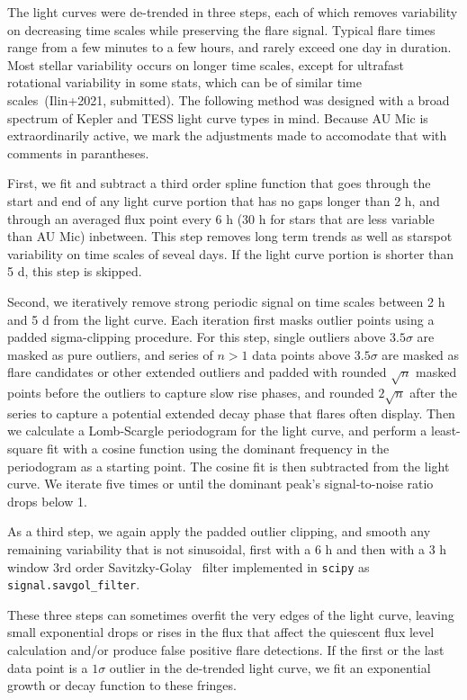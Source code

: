 \documentclass[fleqn,usenatbib,letters]{mnras}%
\begin{document}

The light curves were de-trended in three steps, each of which removes variability on decreasing time scales while preserving the flare signal. Typical flare times range from a few minutes to a few hours, and rarely exceed one day in duration. Most stellar variability occurs on longer time scales, except for ultrafast rotational variability in some stats, which can be of similar time scales~(Ilin+2021, submitted). The following method was designed with a broad spectrum of Kepler and TESS light curve types in mind. Because AU Mic is extraordinarily active, we mark the adjustments made to accomodate that with comments in parantheses. 

First, we fit and subtract a third order spline function that goes through the start and end of any light curve portion that has no gaps longer than 2 h, and through an averaged flux point every 6 h (30 h for stars that are less variable than AU Mic) inbetween. This step removes long term trends as well as starspot variability on time scales of seveal days. If the light curve portion is shorter than 5 d, this step is skipped. 

Second, we iteratively remove strong periodic signal on time scales between 2 h and 5 d from the light curve. Each iteration first masks outlier points using a padded sigma-clipping procedure. For this step, single outliers above $3.5 \sigma$ are masked as pure outliers, and series of $n>1$ data points above $3.5 \sigma$ are masked as flare candidates or other extended outliers and padded with rounded $\sqrt{n}$ masked points before the outliers to capture slow rise phases, and rounded $2\sqrt{n}$ after the series to capture a potential extended decay phase that flares often display. Then we calculate a Lomb-Scargle periodogram for the light curve, and perform a least-square fit with a cosine function using the dominant frequency in the periodogram as a starting point. The cosine fit is then subtracted from the light curve. We iterate five times or until the dominant peak's signal-to-noise ratio drops below 1. 

As a third step, we again apply the padded outlier clipping, and smooth any remaining variability that is not sinusoidal, first with a 6 h and then with a 3 h window 3rd order Savitzky-Golay~\citep{savitzky1964} filter implemented in \texttt{scipy} as \texttt{signal.savgol\_filter}.

These three steps can sometimes overfit the very edges of the light curve, leaving small exponential drops or rises in the flux that affect the quiescent flux level calculation and/or produce false positive flare detections. If the first or the last data point is a $1\sigma$ outlier in the de-trended light curve, we fit an exponential growth or decay function to these fringes.
\end{document}
